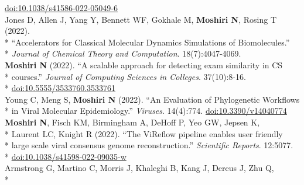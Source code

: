 \documentclass[margin,line]{res}
\begin{document}
\begin{resume}
\hspace*{8mm} \href{https://doi.org/10.1038/s41586-022-05049-6}{doi:10.1038/s41586-022-05049-6}\\
\hspace*{4mm} Jones D, Allen J, Yang Y, Bennett WF, Gokhale M, \textbf{Moshiri N}, Rosing T (2022).\\*
\hspace*{9.5mm} ``Accelerators for Classical Molecular Dynamics Simulations of Biomolecules.''\\*\vspace{2mm}
\hspace*{8mm} \textit{Journal of Chemical Theory and Computation}. 18(7):4047-4069.\\
\hspace*{4mm} \textbf{Moshiri N} (2022). ``A scalable approach for detecting exam similarity in CS\\*
\hspace*{9.5mm} courses.'' \textit{Journal of Computing Sciences in Colleges}. 37(10):8-16.\\*\vspace{2mm}
\hspace*{8mm} \href{https://dl.acm.org/doi/abs/10.5555/3533760.3533761}{doi:10.5555/3533760.3533761}\\
\hspace*{4mm} Young C, Meng S, \textbf{Moshiri N} (2022). ``An Evaluation of Phylogenetic Workflows\\*\vspace{2mm}
\hspace*{8mm} in Viral Molecular Epidemiology.'' \textit{Viruses}. 14(4):774. \href{https://doi.org/10.3390/v14040774}{doi:10.3390/v14040774}\\
\hspace*{4mm} \textbf{Moshiri N}, Fisch KM, Birmingham A, DeHoff P, Yeo GW, Jepsen K,\\*
\hspace*{9.5mm} Laurent LC, Knight R (2022). ``The ViReflow pipeline enables user friendly\\*
\hspace*{9.5mm} large scale viral consensus genome reconstruction.'' \textit{Scientific Reports}. 12:5077.\\*\vspace{2mm}
\hspace*{8mm} \href{https://doi.org/10.1038/s41598-022-09035-w}{doi:10.1038/s41598-022-09035-w}\\
\hspace*{4mm} Armstrong G, Martino C, Morris J, Khaleghi B, Kang J, Dereus J, Zhu Q,\\*

\end{resume}
\end{document}
